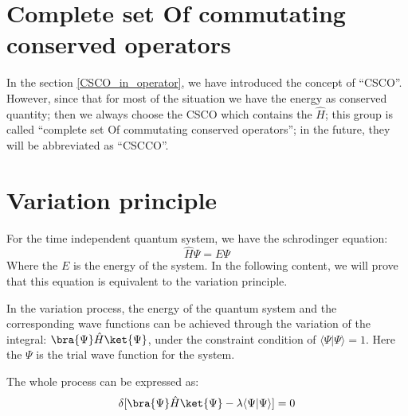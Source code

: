 \section{Complete set Of commutating conserved
operators}\label{SE:1}
%
%
%
%
In the section \ref{CSCO_in_operator}, we have introduced the
concept of ``CSCO''. However, since that for most of the situation
we have the energy as conserved quantity; then we always choose the
CSCO which contains the $\hat{H}$; this group is called ``complete
set Of commutating conserved operators''; in the future, they will
be abbreviated as ``CSCCO''.

\section{Variation principle}\label{SE:2}
%
%
 For the time independent quantum system, we have the
schrodinger equation:
\begin{equation}\label{SEeq:5}
\hat{H}\Psi = E\Psi
\end{equation}
Where the $E$ is the energy of the system. In the following content,
we will prove that this equation is equivalent to the variation
principle.

In the variation process, the energy of the quantum system and the
corresponding wave functions can be achieved through the variation
of the integral: $\bra{\Psi}\hat{H}\ket{\Psi}$, under the constraint
condition of $\langle\Psi|\Psi\rangle = 1$. Here the $\Psi$ is the
trial wave function for the system.

The whole process can be expressed as:
\begin{equation}\label{SEeq:6}
\delta [\bra{\Psi}\hat{H}\ket{\Psi} - \lambda
\langle\Psi|\Psi\rangle] = 0
\end{equation}

